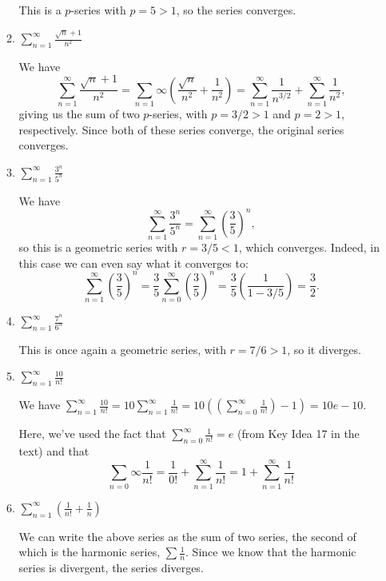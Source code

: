 \documentclass[12pt]{article}
\newcommand{\di}{\displaystyle}
\begin{document}
\begin{enumerate}
\begin{enumerate}
This is a $p$-series with  $p=5>1$, so the series converges.
 
 \item $\di \sum_{n=1}^\infty \frac{\sqrt{n}+1}{n^2}$

\bigskip

We have
\[
\sum_{n=1}^\infty \frac{\sqrt{n}+1}{n^2} = \sum_{n=1}\infty \left(\frac{\sqrt{n}}{n^2}+\frac{1}{n^2}\right) = \sum_{n=1}^\infty \frac{1}{n^{3/2}}+\sum_{n=1}^\infty \frac{1}{n^2},
\]
giving us the sum of two $p$-series, with $p=3/2>1$ and $p=2>1$, respectively. Since both of these series converge, the original series converges.

 \item $\di \sum_{n=1}^\infty \frac{3^n}{5^n}$

\bigskip

We have 
\[
\sum_{n=1}^\infty \frac{3^n}{5^n} = \sum_{n=1}^\infty\left(\frac{3}{5}\right)^n,
\]
so this is a geometric series with $r=3/5<1$, which converges. Indeed, in this case we can even say what it converges to:
\[
\sum_{n=1}^\infty\left(\frac{3}{5}\right)^n = \frac{3}{5}\sum_{n=0}^\infty\left(\frac{3}{5}\right)^n = \frac{3}{5}\left(\frac{1}{1-3/5}\right) = \frac{3}{2}.
\]

 \item $\di \sum_{n=1}^\infty \frac{7^n}{6^n}$
 
 This is once again a geometric series, with $r=7/6>1$, so it diverges.
 
 \item $\di \sum_{n=1}^\infty \frac{10}{n!}$
 
 \bigskip
 
 We have $\di \sum_{n=1}^\infty \frac{10}{n!} = 10\sum_{n=1}^\infty \frac{1}{n!} = 10\left(\left(\sum_{n=0}^\infty\frac{1}{n!}\right)-1\right) = 10e-10.$
 
 Here, we've used the fact that $\sum_{n=0}^\infty\frac{1}{n!} = e$ (from Key Idea 17 in the text) and that
 \[
 \sum_{n=0}\infty \frac{1}{n!} = \frac{1}{0!}+\sum_{n=1}^\infty \frac{1}{n!} = 1+ \sum_{n=1}^\infty \frac{1}{n!}
 \]
 
 \item $\di \sum_{n=1}^\infty\left(\frac{1}{n!}+\frac{1}{n}\right)$
 
 \bigskip
 
 We can write the above series as the sum of two series, the second of which is the harmonic series, $\sum\frac{1}{n}$. Since we know that the harmonic series is divergent, the series diverges.
 
\end{enumerate}


\end{enumerate}
\end{document}
